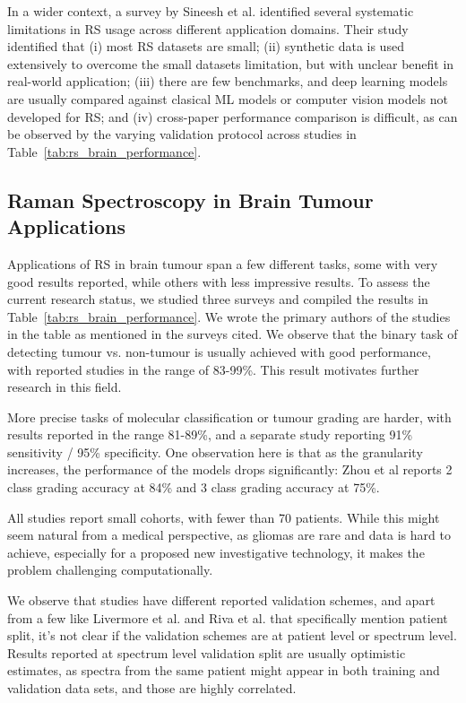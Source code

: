 In a wider context, a survey by Sineesh et al. \cite{sineesh2026raman} identified several systematic limitations in RS usage across different application domains. Their study identified that (i) most RS datasets are small; (ii) synthetic data is used extensively to overcome the small datasets limitation, but with unclear benefit in real-world application; (iii) there are few benchmarks, and deep learning models are usually compared against clasical ML models or computer vision models not developed for RS; and (iv) cross-paper performance comparison is difficult, as can be observed by the varying validation protocol across studies in Table~\ref{tab:rs_brain_performance}.


\subsection*{Raman Spectroscopy in Brain Tumour Applications}

Applications of RS in brain tumour span a few different tasks, some with very good results reported, while others with less impressive results. To assess the current research status, we studied three surveys \cite{Hollon2021, Murugappan2023,stupak2025raman} and compiled the results in Table~\ref{tab:rs_brain_performance}. We wrote the primary authors of the studies in the table as mentioned in the surveys cited. We observe that the binary task of detecting tumour vs. non-tumour is usually achieved with good performance, with reported studies in the range of 83-99\%. This result motivates further research in this field.

More precise tasks of molecular classification or tumour grading are harder, with results reported in the range 81-89\%, and a separate study reporting 91\% sensitivity / 95\% specificity. One observation here is that as the granularity increases, the performance of the models drops significantly: Zhou et al reports 2 class grading accuracy at 84\% and 3 class grading accuracy at 75\%.

All studies report small cohorts, with fewer than 70 patients. While this might seem natural from a medical perspective, as gliomas are rare and data is hard to achieve, especially for a proposed new investigative technology, it makes the problem challenging computationally.

We observe that studies have different reported validation schemes, and apart from a few like Livermore et al. and Riva et al. that specifically mention patient split, it's not clear if the validation schemes are at patient level or spectrum level. Results reported at spectrum level validation split are usually optimistic estimates, as spectra from the same patient might appear in both training and validation data sets, and those are highly correlated.


